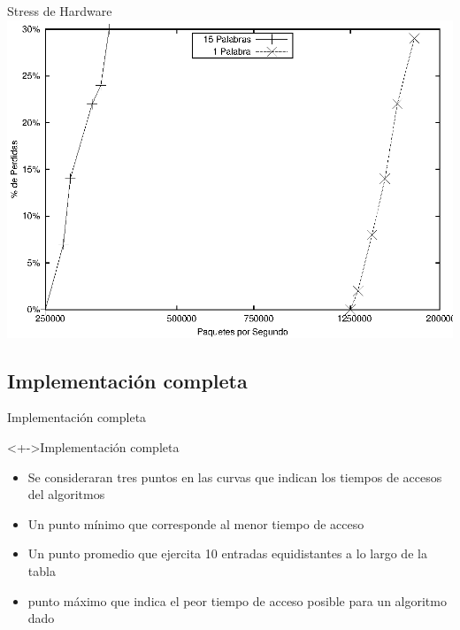 \documentclass[xcolor=dvipsnames]{beamer}
\begin{document}
\begin{frame}{Stress de Hardware} 
\center	
\includegraphics[scale=0.70]{figures/loop.eps} 
\end{frame}

\subsection{Implementación completa}
\begin{frame}{Implementación completa} 
 \begin{block}<+->{Implementación completa}   
    \begin{itemize}
      \scriptsize
     	\item Se consideraran tres puntos en las curvas que indican los tiempos de accesos del algoritmos
     	\item Un punto mínimo que corresponde al menor tiempo de acceso
	\item Un punto promedio que ejercita 10 entradas equidistantes a lo largo de la tabla
	\item punto máximo que indica el peor tiempo de acceso posible para un algoritmo dado	
    \end{itemize}
  \end{block}
\end{frame}
\end{document}
